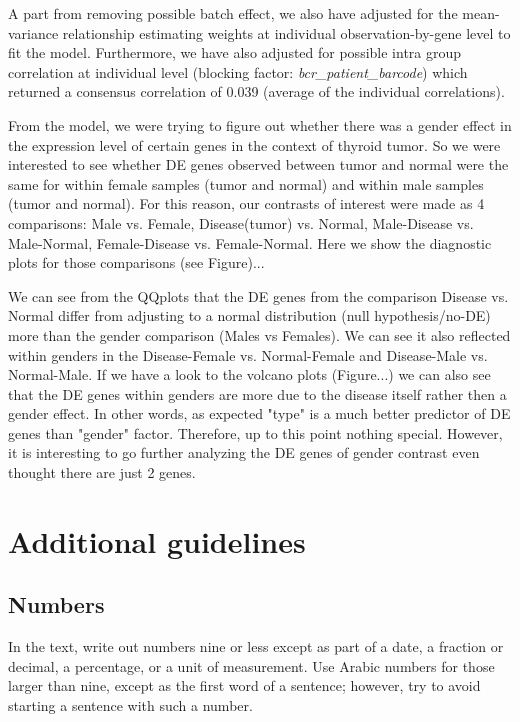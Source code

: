 \documentclass[9pt,twocolumn,twoside]{gsajnl}
\begin{document}
A part from removing possible batch effect, we also have adjusted for the mean-variance relationship estimating weights at individual observation-by-gene level to fit the model. Furthermore, we have also adjusted for possible intra group correlation at individual level (blocking factor: \textit{bcr\_patient\_barcode}) which returned a consensus correlation of 0.039 (average of the individual correlations). 

From the model, we were trying to figure out whether there was a gender effect in the expression level of certain genes in the context of thyroid tumor. So we were interested to see whether DE genes observed between tumor and normal were the same for within female samples (tumor  and normal) and within male samples (tumor and normal). For this reason, our contrasts of interest were made as 4 comparisons: Male vs. Female, Disease(tumor) vs. Normal, Male-Disease vs. Male-Normal,  Female-Disease vs. Female-Normal. Here we show the diagnostic plots for those comparisons (see Figure)...

We can see from the QQplots that the DE genes from the comparison Disease vs. Normal differ from adjusting to a normal distribution (null hypothesis/no-DE) more than the gender comparison (Males vs Females). We can see it also reflected within genders in the Disease-Female vs. Normal-Female and Disease-Male vs. Normal-Male. If we have a look to the volcano plots (Figure...) we can also see that the DE genes within genders are more due to the disease itself rather then a gender effect. In other words, as expected "type" is a much better predictor of DE genes than "gender" factor. Therefore, up to this point nothing special. However, it is interesting to go further analyzing the DE genes of gender contrast even thought there are just 2 genes. 

\section*{Additional guidelines}

\subsection*{Numbers} In the text, write out numbers nine or less except as part of a date, a fraction or decimal, a percentage, or a unit of measurement. Use Arabic numbers for those larger than nine, except as the first word of a sentence; however, try to avoid starting a sentence with such a number.
\end{document}
